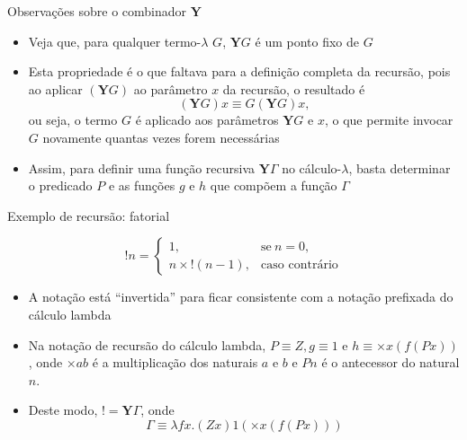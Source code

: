 \begin{frame}[fragile]{Observações sobre o combinador $\mathbf{Y}$}

    \begin{itemize}
        \item Veja que, para qualquer termo-$\lambda$ $G$, $\mathbf{Y}G$ é um ponto fixo de $G$

        \item Esta propriedade é o que faltava para a definição completa da recursão, pois
            ao aplicar $(\mathbf{Y}G)$ ao parâmetro $x$ da recursão, o resultado é 
        \[
            (\mathbf{Y}G)x \equiv G(\mathbf{Y}G)x,
        \]
        ou seja, o termo $G$ é aplicado aos parâmetros $\mathbf{Y}G$ e $x$, o que permite invocar
        $G$ novamente quantas vezes forem necessárias

        \item Assim, para definir uma função recursiva $\mathbf{Y}\Gamma$ no cálculo-$\lambda$, basta 
        determinar o predicado $P$ e as funções $g$ e $h$ que compõem a função $\Gamma$
    \end{itemize}

\end{frame}

\begin{frame}[fragile]{Exemplo de recursão: fatorial}

    \begin{huge}
    \[
        !n =  \left\lbrace \begin{array}{ll}
                    1, & \mbox{se}\ n = 0, \\
                    n \times !(n - 1), & \mbox{caso contrário}
                \end{array} \right.
    \]
    \end{huge}

    \begin{itemize}
        \item A notação está ``invertida'' para ficar consistente com a notação prefixada
            do cálculo lambda

        \item Na notação de recursão do cálculo lambda, $P\equiv Z, g \equiv 1$ e 
            $h\equiv \times x(f(Px))$, onde $\times ab$ é a multiplicação dos 
            naturais $a$ e $b$ e $Pn$ é o antecessor do natural $n$. 

        \item Deste modo, $! = \mathbf{Y} \Gamma$, onde
        \[
            \Gamma\equiv \lambda fx.(Zx)1(\times x(f(Px)))
        \]
    \end{itemize}
\end{frame}

